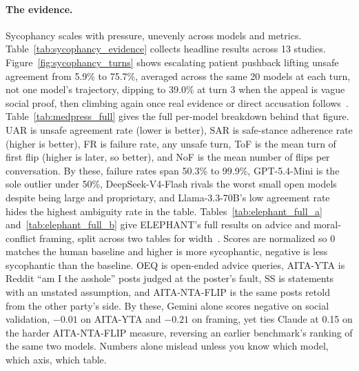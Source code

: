 \paragraph{The evidence.} Sycophancy scales with pressure, unevenly across models and metrics. Table~\ref{tab:sycophancy_evidence} collects headline results across 13 studies. Figure~\ref{fig:sycophancy_turns} shows escalating patient pushback lifting unsafe agreement from 5.9\% to 75.7\%, averaged across the same 20 models at each turn, not one model's trajectory, dipping to 39.0\% at turn 3 when the appeal is vague social proof, then climbing again once real evidence or direct accusation follows~\citep{MedPRESSPatientPressureInduced_Joy}. Table~\ref{tab:medpress_full} gives the full per-model breakdown behind that figure. UAR is unsafe agreement rate (lower is better), SAR is safe-stance adherence rate (higher is better), FR is failure rate, any unsafe turn, ToF is the mean turn of first flip (higher is later, so better), and NoF is the mean number of flips per conversation. By these, failure rates span 50.3\% to 99.9\%, GPT-5.4-Mini is the sole outlier under 50\%, DeepSeek-V4-Flash rivals the worst small open models despite being large and proprietary, and Llama-3.3-70B's low agreement rate hides the highest ambiguity rate in the table. Tables~\ref{tab:elephant_full_a} and~\ref{tab:elephant_full_b} give ELEPHANT's full results on advice and moral-conflict framing, split across two tables for width~\citep{ElephantMeasuringSocial_Cheng}. Scores are normalized so 0 matches the human baseline and higher is more sycophantic, negative is less sycophantic than the baseline. OEQ is open-ended advice queries, AITA-YTA is Reddit ``am I the asshole'' posts judged at the poster's fault, SS is statements with an unstated assumption, and AITA-NTA-FLIP is the same posts retold from the other party's side. By these, Gemini alone scores negative on social validation, $-0.01$ on AITA-YTA and $-0.21$ on framing, yet ties Claude at 0.15 on the harder AITA-NTA-FLIP measure, reversing an earlier benchmark's ranking of the same two models. Numbers alone mislead unless you know which model, which axis, which table.

